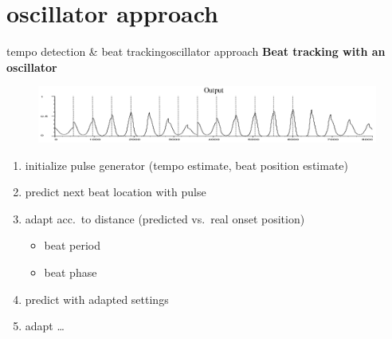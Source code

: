     \section{oscillator approach}
        \begin{frame}{tempo detection \& beat tracking}{oscillator approach}
            \textbf{Beat tracking with an oscillator}
            \begin{figure}
                \centering
                    \includegraphics[scale=.3]{graph/BPM_large_oscillator}
            \end{figure}
            
            \begin{enumerate}
                \item	initialize pulse generator (tempo estimate, beat position estimate)
                \item<2->	predict next beat location with pulse
                \item<3->	adapt acc.\ to distance (predicted vs.\ real onset position)
                    \begin{itemize}
                        \item	beat period
                        \item	beat phase
                    \end{itemize}
                \item<4->	predict with adapted settings
                \item<4->   adapt \ldots
            \end{enumerate}
        \end{frame}
